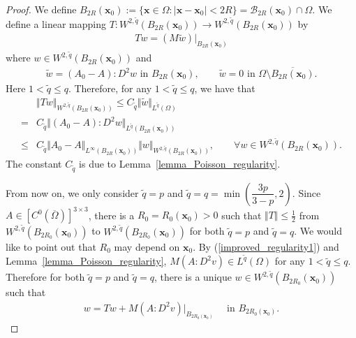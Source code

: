 \documentclass[12pt]{amsart}
\newcommand{\boldx}{\boldsymbol{x}}
\theoremstyle{definition}
\theoremstyle{remark}
\begin{document}
\begin{proof}
We define $B_{2R}(\boldx_{0}):=\{ \boldx\in \Omega: \vert \boldx - \boldx_{0} \vert < 2R\} 
= \mathcal{B}_{2R}(\boldx_{0}) \cap \Omega$. We define a linear mapping 
$T : W^{2,\tilde{q}}(B_{2R}(\boldx_{0})) \rightarrow W^{2,\tilde{q}}(B_{2R}(\boldx_{0}))$ by 
\begin{align}
\label{map_T}
Tw = \left( M \tilde{w}\right)|_{B_{2R}(\boldx_{0})}
\end{align}
where $w \in W^{2,\tilde{q}}(B_{2R}(\boldx_{0}))$ and 
\begin{align}
\label{tilde_w_T}
\tilde{w} = (A_{0} - A):D^{2} w \text{ in } B_{2R}(\boldx_{0}),\qquad \tilde{w} = 0 \text{ in } 
\Omega \setminus \overline{B_{2R}(\boldx_{0})}.
\end{align}
Here $1 < \tilde{q} \leq q$. 
Therefore, for any $ 1 < \tilde{q} \leq q$, we have that 
\begin{align*}
& \Vert Tw \Vert_{W^{2,\tilde{q}}(B_{2R}(\boldx_{0}))} 
\leq C_{\tilde{q}} \Vert \tilde{w}\Vert_{L^{\tilde{q}}(\Omega)} \\
= & C_{\tilde{q}} \Vert (A_{0} - A):D^{2} w \Vert_{L^{\tilde{q}}(B_{2R}(\boldx_{0}))} \\
\leq & C_{\tilde{q}} \Vert A_{0} - A \Vert_{L^{\infty}(B_{2R}(\boldx_{0}))} 
\Vert w\Vert_{W^{2,\tilde{q}}(B_{2R}(\boldx_{0}))}, \qquad \forall w \in W^{2,\tilde{q}}(B_{2R}(\boldx_{0})).
\end{align*}
The constant $C_{\tilde{q}}$ is due to Lemma~\ref{lemma_Poisson_regularity}.

From now on, we only consider $\tilde{q} = p$ and $\tilde{q}= q = \min (\dfrac{3p}{3-p}, 2)$.
Since $A \in [C^{0}(\overline{\Omega})]^{3 \times 3}$, 
there is a $R_{0}=R_{0}(\boldx_{0}) > 0$ such that $\Vert T\Vert \leq \frac{1}{2}$ from 
$W^{2,\tilde{q}}(B_{2R_{0}}(\boldx_{0}))$ to $W^{2,\tilde{q}}(B_{2R_{0}}(\boldx_{0}))$ for  
both $\tilde{q} = p$ and $\tilde{q}= q$. We would like to point out 
that $R_{0}$ may depend on $\boldx_{0}$. 
By (\ref{improved_regularity1}) and Lemma~\ref{lemma_Poisson_regularity}, 
$M\left( A:D^{2} v \right) \in L^{\tilde{q}}(\Omega)$ 
for any $1 < \tilde{q} \leq q$. 
Therefore for both $\tilde{q} = p$ and $\tilde{q}= q$, there is 
a unique $w \in W^{2,\tilde{q}}(B_{2R_{0}}(\boldx_{0}))$ such that 
\begin{align}
\label{w_T_unique}
w = T w + M\left( A:D^{2} v \right)|_{B_{2R_{0}(\boldx_{0})}} \quad \text{ in }B_{2R_{0}(\boldx_{0})}.
\end{align}


\end{proof}
\end{document}
